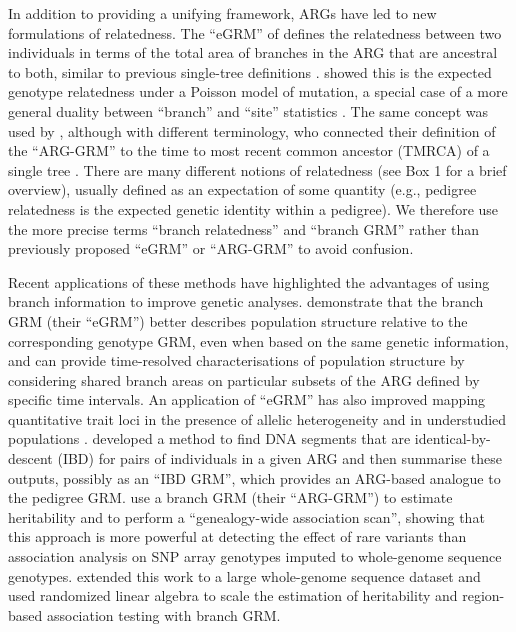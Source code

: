 In addition to providing a unifying framework,
ARGs have led to new formulations of relatedness.
%
The ``eGRM'' of \citet{fan2022genealogical}
defines the relatedness between two individuals
in terms of the total area of branches in the ARG that are ancestral to both,
similar to previous single-tree definitions \citep{slatkin1991inbreeding}.
%
\citet{fan2022genealogical} showed this is the expected genotype relatedness
under a Poisson model of mutation,
a special case of a more general duality between ``branch''
and ``site'' statistics \citep{ralph2019empirical, ralph2020efficiently}.
%
The same concept was used by \citet{zhang2023biobank},
although with different terminology,
who connected their definition of the ``ARG-GRM'' to
the time to most recent common ancestor (TMRCA)
of a single tree \citep{slatkin1991inbreeding, mcvean2009genealogical}.
%
There are many different notions of relatedness (see Box 1 for a 
brief overview), usually defined as an expectation of some 
quantity (e.g., pedigree relatedness is the expected genetic identity within a pedigree).
We therefore use the more precise terms 
``branch relatedness'' and ``branch GRM'' 
rather than previously proposed ``eGRM'' or ``ARG-GRM'' 
to avoid confusion.

Recent applications of these methods have highlighted the advantages of
using branch information to improve genetic analyses.
%
\citet{fan2022genealogical} demonstrate that the branch GRM (their ``eGRM'')
better describes population structure relative to the corresponding genotype GRM,
even when based on the same genetic information,
and can provide time-resolved characterisations of population structure
by considering shared branch areas on particular subsets of the ARG
defined by specific time intervals.
%
An application of ``eGRM'' has also improved mapping quantitative trait loci
in the presence of allelic heterogeneity and in understudied populations \citep{link2023tree}.
%
\citet{tsambos2022efficient} developed a method
to find DNA segments that are identical-by-descent (IBD) for pairs of individuals in a given ARG and
then summarise these outputs, possibly as an ``IBD GRM'',
which provides an ARG-based analogue to the pedigree GRM.
%
\citet{zhang2023biobank} use a branch GRM (their ``ARG-GRM'')
to estimate heritability and to perform a ``genealogy-wide association scan'',
showing that this approach is more powerful at detecting the effect of rare variants
than association analysis on SNP array genotypes imputed to whole-genome sequence genotypes.
%
\citet{gunnarsson2024scalable} extended this work to a large whole-genome sequence dataset
and \citet{zhu2024variance} used randomized linear algebra to
scale the estimation of heritability and region-based association testing with branch GRM.

